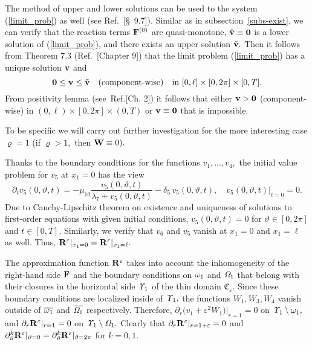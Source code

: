 \documentclass[reqno]{amsart}            %
\numberwithin{equation}{section}
\begin{document}
The method of upper and lower solutions can be used to the system  (\ref{limit_prob}) as well (see Ref.~\cite{Pao}[\S~9.7]).
Similar as in subsection~\ref{subs-exist}, we can verify that the reaction terms ${\bf F}^{(0)}$ are quasi-monotone, ${\bf \hat{v}}\equiv {\bf 0}$ is a lower solution of (\ref{limit_prob}), and there exists an upper solution ${\bf \tilde{v}}.$ Then it follows from Theorem 7.3 (Ref.~\cite{Pao}[Chapter 9]) that the limit problem (\ref{limit_prob}) has a unique solution ${\bf v}$ and
\begin{equation}\label{bound-5}
{\bf 0}\le {\bf v} \le {\bf \tilde{v}} \quad (\text{component-wise}) \quad \text{in} \ [0,\ell]\times[0, 2\pi]\times [0,T].
\end{equation}
From positivity lemma (see~Ref.\cite{Pao}[Ch. 2]) it follows that either ${\bf v} >  {\bf 0}$ (component-wise) in $(0,\ell)\times [0, 2\pi]\times (0,T)$
or ${\bf v} \equiv  {\bf 0}$ that is impossible.

To be specific we will carry out further investigation for the more interesting case $\varrho =1$
(if $\varrho >1,$ then ${\bf W}\equiv 0).$

Thanks to the boundary conditions for the functions $v_1,\ldots,v_4,$ the initial value problem for $v_5$ at $x_1=0$ has the view
$$
\partial_t v_5(0,\vartheta,t)  =
- \mu_{10} \dfrac{ v_5(0,\vartheta,t)}{\lambda_7 + v_5(0,\vartheta,t)}  - \delta_5 \, v_5(0,\vartheta,t),\quad v_5(0,\vartheta,t)|_{t=0}=0.
$$
Due to Cauchy-Lipschitz theorem on existence and uniqueness of solutions to first-order equations with given initial conditions,
$v_5(0,\vartheta,t)=0$ for $\vartheta\in[0, 2\pi]$ and $t\in [0, T].$ Similarly, we verify that $v_6$ and $v_5$
vanish at $x_1=0$ and $x_1= \ell$ as well. Thus, ${\bf R}^\varepsilon|_{x_1=0} = {\bf R}^\varepsilon|_{x_1=\ell}.$


The approximation function ${\bf R}^\varepsilon$ takes into account the inhomogeneity
of the right-hand side ${\bf F}$ and the boundary conditions on ${\it \omega}_1$ and ${\it \Omega}_1$
that belong with their closures in the horizontal side ${\it \Upsilon}_1$ of the thin domain $\mathfrak{C}_\varepsilon.$ Since these boundary conditions are localized inside of ${\it \Upsilon}_1,$ the functions $W_1,  W_3, W_4$ vanish outside of $\overline{{\it \omega}_1}$ and
$\overline{{\it \Omega}_1}$ respectively. Therefore,
$\partial_r \big(v_1 + \varepsilon^2 W_1\big)|_{r=1} =0$ on ${\it \Upsilon}_1\setminus {\it \omega}_1,$ and
$\partial_r {\bf R}^\varepsilon|_{r=1} =0$ on ${\it \Upsilon}_1\setminus {\it \Omega}_1.$
Clearly that
$\partial_r {\bf R}^\varepsilon|_{r=1+\varepsilon} =0$
and
 $\partial_{\vartheta}^k{\bf R}^\varepsilon|_{\vartheta=0} =
\partial_{\vartheta}^k{\bf R}^\varepsilon|_{\vartheta=2\pi}$ for $k =0, 1.$
\end{document}
